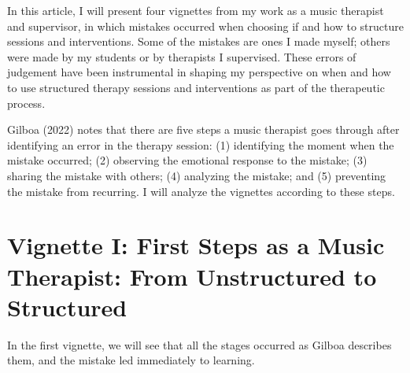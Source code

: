 \documentclass[authordate, empirical, issue]{jote-new-article}
\begin{document}
In this article, I will present four vignettes from my work as a music therapist and supervisor, in which mistakes occurred when choosing if and how to structure sessions and interventions. Some of the mistakes are ones I made myself; others were made by my students or by therapists I supervised. These errors of judgement have been instrumental in shaping my perspective on when and how to use structured therapy sessions and interventions as part of the therapeutic process.



Gilboa (2022) notes that there are five steps a music therapist goes through after identifying an error in the therapy session: (1) identifying the moment when the mistake occurred; (2) observing the emotional response to the mistake; (3) sharing the mistake with others; (4) analyzing the mistake; and (5) preventing the mistake from recurring. I will analyze the vignettes according to these steps.







\section{Vignette I: First Steps as a Music Therapist: From Unstructured to Structured}



In the first vignette, we will see that all the stages occurred as Gilboa describes them, and the mistake led immediately to learning.
\end{document}
